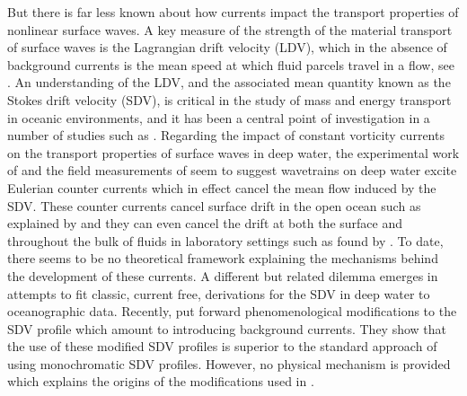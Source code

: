 \documentclass{JFM_Style/jfm}
\begin{document}
But there is far less known about how currents impact the transport properties of nonlinear surface waves.  A key measure of the strength of the material transport of surface waves is the Lagrangian drift velocity (LDV), which in the absence of background currents is the mean speed at which fluid parcels travel in a flow, see \cite{longuet}.  An understanding of the LDV, and the associated mean quantity known as the Stokes drift velocity (SDV), is critical in the study of mass and energy transport in oceanic environments, and it has been a central point of investigation in a number of studies such as \cite{mcwilliams,webb,breivik}.  Regarding the impact of constant vorticity currents on the transport properties of surface waves in deep water, the experimental work of \cite{monismith} and the field measurements of \cite{smith} seem to suggest wavetrains on deep water excite Eulerian counter currents which in effect cancel the mean flow induced by the SDV.  These counter currents cancel surface drift in the open ocean such as explained by \cite{smith} and they can even cancel the drift at both the surface and throughout the bulk of fluids in laboratory settings such as found by \cite{monismith}.  To date, there seems to be no theoretical framework explaining the mechanisms behind the development of these currents.  A different but related dilemma emerges in attempts to fit classic, current free, derivations for the SDV in deep water to oceanographic data.  Recently, \cite{breivik} put forward phenomenological modifications to the SDV profile which amount to introducing background currents. They show that the use of these modified SDV profiles is superior to the standard approach of using monochromatic SDV profiles.  However, no physical mechanism is provided which explains the origins of the modifications used in \cite{breivik}.
\end{document}
